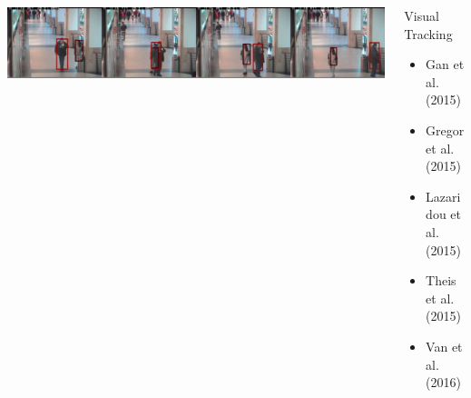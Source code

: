 \begin{frame}
    \begin{columns}            
        \begin{column}{0.6\textwidth}
            \begin{overlayarea}{\textwidth}{\textheight}
                \vspace{0.2in}
                \includegraphics[width=1\linewidth]{images/vt}
            \end{overlayarea}
        \end{column}
        \begin{column}{0.4\textwidth}
            \begin{overlayarea}{\textwidth}{\textheight}
                \begin{block}{Visual Tracking}
                    \begin{itemize}
                      \item Gan et al. (2015) 
                      \item Gregor et al. (2015)
                      \item Lazaridou et al. (2015)
                      \item Theis et al. (2015)
                      \item Van et al. (2016)
                    \end{itemize}
                \end{block}
            \end{overlayarea}
        \end{column}
    \end{columns}
\end{frame}

